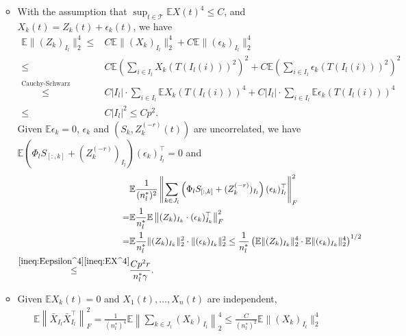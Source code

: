 \documentclass[11pt]{article}
\newcommand{\0}{{\mathbf{0}}}
\newcommand{\1}{{\mathbf{1}}}
\begin{document}
\begin{enumerate}[leftmargin=*]
\begin{itemize}[leftmargin=*]
\begin{equation*}
		\end{equation*}
		\item With the assumption that $\sup_{t\in \mathcal{T}}\mathbb{E}X(t)^4 \leq C$, and $X_k(t) = Z_k(t)  + \epsilon_{k}(t)$, we have
		\begin{equation}\label{ineq:EX^4}
		\begin{split}
		\mathbb{E}\|(Z_k)_{I_l}\|_2^4 \leq & C\mathbb{E}\|(X_k)_{I_l}\|_2^4 + C\mathbb{E}\|(\epsilon_k)_{I_l}\|_2^4 \\
		\leq & C\mathbb{E}\left(\sum_{i\in I_l} X_k(T(I_l(i)))^2 \right)^2 + C\mathbb{E}\left(\sum_{i\in I_l} \epsilon_k(T(I_l(i)))^2 \right)^2\\
		\overset{\text{Cauchy-Schwarz}}{\leq} & C|I_l|\cdot \sum_{i\in I_l} \mathbb{E}X_k(T(I_l(i)))^4 + C|I_l|\cdot \sum_{i\in I_l} \mathbb{E}\epsilon_k(T(I_l(i)))^4\\
		\leq & C|I_l|^2 \leq Cp^2.
		\end{split}
		\end{equation}
		Given $\mathbb{E} \epsilon_k =0$, $\epsilon_k$ and $(S_k, Z^{(-r)}_k(t))$ are uncorrelated, we have\\ $\mathbb{E}\left(\Phi_l S_{[:, k]} + (Z_k^{(-r)})_{I_l}\right) (\epsilon_k)_{I_l}^\top = 0$ and
		\begin{equation*}
		\begin{split}
		& \mathbb{E}\frac{1}{(n_l^\ast)^2}\left\|\sum_{k \in J_l}\left(\Phi_l S_{[:, k]} + (Z_k^{(-r)})_{I_l}\right) (\epsilon_k)_{I_l}^\top\right\|_F^2 \\
		= & \mathbb{E} \frac{1}{n_l^\ast} \mathbb{E} \left\|(Z_k)_{I_k} \cdot (\epsilon_k)_{I_k}^\top\right\|_F^2\\
		= & \mathbb{E}\frac{1}{n_l^\ast} \|(Z_k)_{I_k}\|_2^2 \cdot \|(\epsilon_k)_{I_k}\|_2^2 \leq \frac{1}{n_l^\ast} \left(\mathbb{E} \|(Z_k)_{I_k}\|_2^4 \cdot \mathbb{E}\|(\epsilon_k)_{I_k}\|_2^4\right)^{1/2}\\ \overset{\eqref{ineq:Eepsilon^4}\eqref{ineq:EX^4}}{\leq} & \frac{Cp^2r}{n_l^\ast\gamma}.
		\end{split}
		\end{equation*}
		\item Given $\mathbb{E}X_k(t) = 0$ and $X_1(t),\ldots, X_n(t)$ are independent, 
		\begin{equation*}
		\begin{split}
		& \mathbb{E} \left\|\bar{X}_{I_l}\bar{X}_{I_l}^\top\right\|_F^2 = \frac{1}{(n_l^\ast)^4}\mathbb{E}\left\|\sum_{k\in J_l} (X_k)_{I_l} \right\|_2^4 \leq \frac{C}{(n_l^\ast)^2} \mathbb{E} \|(X_k)_{I_l}\|_2^4\\

\end{split}
\end{equation*}
\end{itemize}
\end{enumerate}
\end{document}
